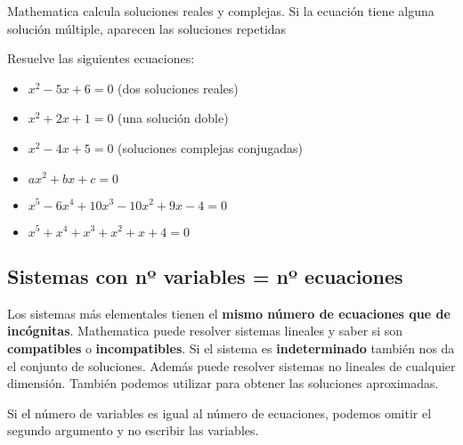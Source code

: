 \documentclass[a4paper,10pt, draft]{article}
\newcommand{\com}[1]{\textbf{\color{blue}{#1}}}
\newenvironment{ejer}{\begin{tcolorbox}[center title, title=Ejercicios,
fonttitle=\sffamily\bfseries,colback=blue!5,colframe=orange]}{\end{tcolorbox}}
\begin{document}
 Mathematica calcula soluciones reales y complejas. Si la ecuación tiene alguna solución múltiple, aparecen las soluciones repetidas


\begin{ejer}

Resuelve las siguientes ecuaciones:

\begin{itemize}

\item  $x^2-5x+6=0$ (dos soluciones reales)


\item  $x^2+2x+1=0$ (una solución doble)


\item $x^2-4x+5=0$ (soluciones complejas conjugadas)


\item  $ax^2+bx+c=0$

\item $x^5-6x^4+10x^3-10x^2+9x-4=0$

\item $x^5+x^4+x^3+x^2+x+4=0$

\end{itemize}

\end{ejer}  

\newpage

\subsection{Sistemas con  nº variables = nº ecuaciones}

Los sistemas más elementales tienen el \textbf{mismo número de ecuaciones que de incógnitas}.  Mathematica puede resolver sistemas lineales y saber si son \textbf{compatibles} o \textbf{incompatibles}. Si el sistema es \textbf{indeterminado} también nos da el conjunto de soluciones. Además puede resolver sistemas no lineales de cualquier dimensión. También podemos utilizar \com{NSolve} para obtener las soluciones aproximadas.

Si el número de variables es igual al número de ecuaciones, podemos omitir el segundo argumento y no escribir las variables.
\end{document}
